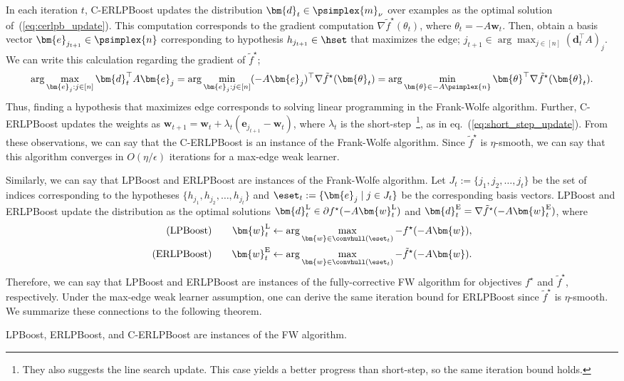 In each iteration $t$, 
C-ERLPBoost updates the distribution $\bm{d}_t \in \psimplex{m}_{\nu}$ 
over examples as the optimal solution of~(\ref{eq:cerlpb_update}). 
This computation corresponds to the gradient computation 
$\nabla \tilde{f}^\star( \theta_t )$, where $\theta_t = - A\bm{w}_t$. 
Then, obtain a basis vector $\bm{e}_{j_{t+1}} \in \psimplex{n}$ 
corresponding to hypothesis $h_{j_{t+1}} \in \hset$ 
that maximizes the edge; 
$j_{t+1} \in \arg \max_{j \in [n]} (\bm{d}_t^\top A)_j$. 
We can write this calculation regarding the gradient of $\tilde{f}^\star$;
\begin{align*}
    \arg \max_{\bm{e}_j : j \in [n]} \bm{d}_t^\top A \bm{e}_j
    = \arg \min_{\bm{e}_j : j \in [n]}
        (-A\bm{e}_j)^\top \nabla \tilde{f}^\star (\bm{\theta}_t)
    = \arg \min_{\bm{\theta} \in -A\psimplex{n}}
        \bm{\theta}^\top \nabla \tilde{f}^\star (\bm{\theta}_t).
\end{align*}
Thus, finding a hypothesis that maximizes edge corresponds to 
solving linear programming in the Frank-Wolfe algorithm. 
Further, C-ERLPBoost updates the weights as 
$\bm{w}_{t+1} = \bm{w}_t + \lambda_t (\bm{e}_{j_{t+1}} - \bm{w}_t)$, 
where $\lambda_t$ is the short-step~\footnote{%
    They also suggests the line search update. %
    This case yields a better progress than short-step, %
    so the same iteration bound holds. %
}, as in eq.~(\ref{eq:short_step_update}).
From these observations, we can say that the C-ERLPBoost is 
an instance of the Frank-Wolfe algorithm. 
Since $\tilde{f}^\star$ is $\eta$-smooth, we can say that 
this algorithm converges in $O(\eta/\epsilon)$ iterations 
for a max-edge weak learner. 

Similarly, we can say that LPBoost and ERLPBoost are 
instances of the Frank-Wolfe algorithm. 
Let $J_t := \{j_1, j_2, \dots, j_{t} \}$ be the set of indices 
corresponding to the hypotheses $\{h_{j_1}, h_{j_2}, \dots, h_{j_{t}}\}$ 
and $\eset_t := \{ \bm{e}_{j} \mid j \in J_t \}$ be 
the corresponding basis vectors. 
LPBoost and ERLPBoost update the distribution as 
the optimal solutions 
$\bm{d}_t^{\rm{L}} \in \partial f^\star( -A \bm{w}_t^{\rm L})$ 
and $\bm{d}_t^{\rm{E}} = \nabla \tilde{f}^\star (-A \bm{w}_t^{\rm E})$, 
where 
\begin{alignat}{2}
    \label{eq:lpb_weight}
    \text{(LPBoost)} & \quad &
        \bm{w}_t^{\rm{L}} \gets \arg \max_{\bm{w} \in \convhull(\eset_t)}
        - f^\star (-A \bm{w}), \\
    \label{eq:erlpb_weight}
    \text{(ERLPBoost)} & \quad &
        \bm{w}_t^{\rm{E}} \gets \arg \max_{\bm{w} \in \convhull(\eset_t)}
        - \tilde{f}^\star (-A \bm{w}).
\end{alignat}
Therefore, we can say that LPBoost and ERLPBoost are 
instances of the fully-corrective FW algorithm 
for objectives $f^\star$ and $\tilde{f}^\star$, respectively. 
Under the max-edge weak learner assumption, 
one can derive the same iteration bound for ERLPBoost 
since $\tilde{f}^\star$ is $\eta$-smooth. 
We summarize these connections to the following theorem. 
\begin{thm.}
    LPBoost, ERLPBoost, and C-ERLPBoost are instances of the FW algorithm. 
\end{thm.}
%
%
%
%
%
%
%
%
%
%
%
%
